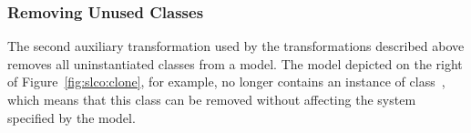 \subsubsection{Removing Unused Classes}
The second auxiliary transformation used by the transformations described above removes all uninstantiated classes from a model.
The model depicted on the right of Figure~\ref{fig:slco:clone}, for example, no longer contains an instance of class~, which means that this class can be removed without affecting the system specified by the model.




